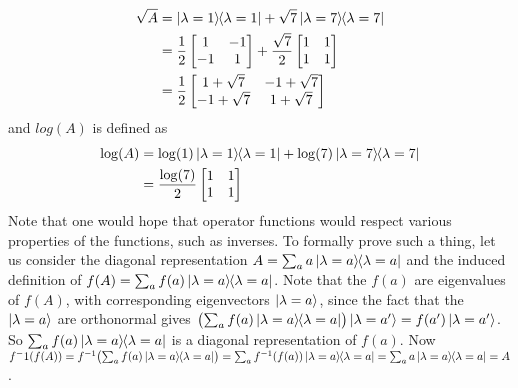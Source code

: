 \begin{align*}
	\sqrt{A} &= \ket{\lambda = 1}\hspace{-1mm} \bra{\lambda = 1} + \sqrt{7} \ket{\lambda = 7}\hspace{-1mm} \bra{\lambda = 7}\\
		&= \frac{1}{2} \begin{bmatrix}
		1 & -1 \\
		-1 & 1
		\end{bmatrix}
		+
		\frac{\sqrt{7}}{2} \begin{bmatrix}
		1 & 1 \\
		1 & 1
		\end{bmatrix}\\
		&=
		\frac{1}{2}
		 \begin{bmatrix}
			1+\sqrt{7} & -1+\sqrt{7} \\
			-1 + \sqrt{7} & 1+\sqrt{7}
		\end{bmatrix}
\end{align*}
and $log(A)$ is defined as
 \begin{align*}
 	\log (A) &=  \log (1) \ket{\lambda = 1}\hspace{-1mm} \bra{\lambda = 1} + \log (7) \ket{\lambda = 7}\hspace{-1mm} \bra{\lambda = 7}\\
 		&= \frac{\log (7)}{2} \begin{bmatrix}
	 		1 & 1 \\
	 		1 & 1
 		\end{bmatrix}
 \end{align*}
Note that one would hope that operator functions would respect various properties of the functions, such as inverses. To formally prove such a thing, let us consider the diagonal representation $A=\sum_a a\ket{\lambda=a}\hspace{-1mm} \bra{\lambda=a}$ and the induced definition of $f(A)=\sum_a f(a)\ket{\lambda = a}\hspace{-1mm} \bra{\lambda = a}$.  Note that the $f(a)$ are eigenvalues of $f(A)$, with corresponding eigenvectors $\ket{\lambda=a}$, since the fact that the $\ket{\lambda=a}$ are orthonormal gives $\bigl(\sum_a f(a) \ket{\lambda=a}\hspace{-1mm} \bra{\lambda=a}\bigr)\ket{\lambda=a'} = f(a')\ket{\lambda=a'}$.  So $\sum_a f(a)\ket{\lambda = a}\hspace{-1mm} \bra{\lambda = a}$ is a diagonal representation of $f(a)$.  Now $f^-1(f(A)) = f^{-1}\bigl(\sum_a f(a)\ket{\lambda=a}\hspace{-1mm} \bra{\lambda=a}\bigr) = \sum_a f^{-1}(f(a))\ket{\lambda=a}\hspace{-1mm} \bra{\lambda=a} = \sum_a a \ket{\lambda=a}\hspace{-1mm} \bra{\lambda=a} = A$.


